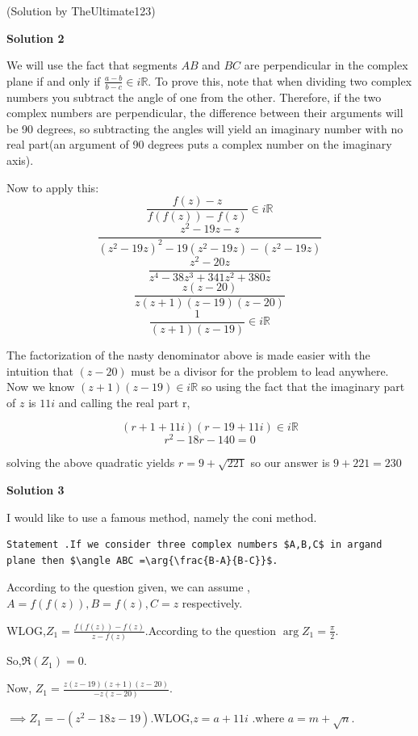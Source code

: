 \begin{enumerate}
 (Solution by TheUltimate123)

 



\textbf{Solution 2}

We will use the fact that segments $AB$ and $BC$ are perpendicular in the complex plane if and only if $\frac{a-b}{b-c}\in i\mathbb{R}$. To prove this, note that when dividing two complex numbers you subtract the angle of one from the other. Therefore, if the two complex numbers are perpendicular, the difference between their arguments will be 90 degrees, so subtracting the angles will yield an imaginary number with no real part(an argument of 90 degrees puts a complex number on the imaginary axis).

 Now to apply this: 
 \[\frac{f(z)-z}{f(f(z))-f(z)}\in i\mathbb{R}\]
 \[\frac{z^2-19z-z}{(z^2-19z)^2-19(z^2-19z)-(z^2-19z)}\]
 \[\frac{z^2-20z}{z^4-38z^3+341z^2+380z}\]
 \[\frac{z(z-20)}{z(z+1)(z-19)(z-20)}\]
 \[\frac{1}{(z+1)(z-19)}\in i\mathbb{R}\]

 The factorization of the nasty denominator above is made easier with the intuition that $(z-20)$ must be a divisor for the problem to lead anywhere. Now we know $(z+1)(z-19)\in i\mathbb{R}$ so using the fact that the imaginary part of $z$ is $11i$ and calling the real part r, 

 
 \[(r+1+11i)(r-19+11i)\in i\mathbb{R}\]
 \[r^2-18r-140=0\]

 solving the above quadratic yields $r=9+\sqrt{221}$ so our answer is $9+221=\boxed{230}$




\textbf{Solution 3}

I would like to use a famous method, namely the coni method. 

 \begin{verbatim}
Statement .If we consider three complex numbers $A,B,C$ in argand plane then $\angle ABC =\arg{\frac{B-A}{B-C}}$.
\end{verbatim}

According to the question given, we can assume ,$A= f(f(z)),B=f(z),C= z$ respectively.

 WLOG,$Z_1= \frac{f(f(z))-f(z)}{z-f(z)}$.According to the question $\arg{Z_1}=\frac{\pi}{2}$.

 So,$\Re (Z_1)=0$.

 Now, $Z_1=\frac{z(z-19)(z+1)(z-20)}{-z(z-20)}$.

 $\implies Z_1= -(z^2-18z-19)$.WLOG,$z=a+11i$ .where $a=m+\sqrt{n}$.


\end{enumerate}
